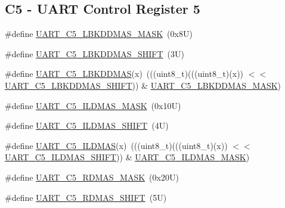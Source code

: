 \subsection*{C5 -\/ U\+A\+RT Control Register 5}
\begin{DoxyCompactItemize}
\item 
\#define \mbox{\hyperlink{group___u_a_r_t___register___masks_gad49b1674b1fa3e8be3e00d6499926d0e}{U\+A\+R\+T\+\_\+\+C5\+\_\+\+L\+B\+K\+D\+D\+M\+A\+S\+\_\+\+M\+A\+SK}}~(0x8\+U)
\item 
\#define \mbox{\hyperlink{group___u_a_r_t___register___masks_gafffde329d848e617b4983aa758f0b3fc}{U\+A\+R\+T\+\_\+\+C5\+\_\+\+L\+B\+K\+D\+D\+M\+A\+S\+\_\+\+S\+H\+I\+FT}}~(3\+U)
\item 
\#define \mbox{\hyperlink{group___u_a_r_t___register___masks_gacb884d8d6eada9e7fef6dded30e0318b}{U\+A\+R\+T\+\_\+\+C5\+\_\+\+L\+B\+K\+D\+D\+M\+AS}}(x)~(((uint8\+\_\+t)(((uint8\+\_\+t)(x)) $<$$<$ \mbox{\hyperlink{group___u_a_r_t___register___masks_gafffde329d848e617b4983aa758f0b3fc}{U\+A\+R\+T\+\_\+\+C5\+\_\+\+L\+B\+K\+D\+D\+M\+A\+S\+\_\+\+S\+H\+I\+FT}})) \& \mbox{\hyperlink{group___u_a_r_t___register___masks_gad49b1674b1fa3e8be3e00d6499926d0e}{U\+A\+R\+T\+\_\+\+C5\+\_\+\+L\+B\+K\+D\+D\+M\+A\+S\+\_\+\+M\+A\+SK}})
\item 
\#define \mbox{\hyperlink{group___u_a_r_t___register___masks_gaaccb4d1301941530866ef30d9856bcfb}{U\+A\+R\+T\+\_\+\+C5\+\_\+\+I\+L\+D\+M\+A\+S\+\_\+\+M\+A\+SK}}~(0x10\+U)
\item 
\#define \mbox{\hyperlink{group___u_a_r_t___register___masks_ga64ff52253386b38f547fbe9e9e257f3a}{U\+A\+R\+T\+\_\+\+C5\+\_\+\+I\+L\+D\+M\+A\+S\+\_\+\+S\+H\+I\+FT}}~(4\+U)
\item 
\#define \mbox{\hyperlink{group___u_a_r_t___register___masks_ga994e7eac93e9ae1e7ae7fadf84d51d47}{U\+A\+R\+T\+\_\+\+C5\+\_\+\+I\+L\+D\+M\+AS}}(x)~(((uint8\+\_\+t)(((uint8\+\_\+t)(x)) $<$$<$ \mbox{\hyperlink{group___u_a_r_t___register___masks_ga64ff52253386b38f547fbe9e9e257f3a}{U\+A\+R\+T\+\_\+\+C5\+\_\+\+I\+L\+D\+M\+A\+S\+\_\+\+S\+H\+I\+FT}})) \& \mbox{\hyperlink{group___u_a_r_t___register___masks_gaaccb4d1301941530866ef30d9856bcfb}{U\+A\+R\+T\+\_\+\+C5\+\_\+\+I\+L\+D\+M\+A\+S\+\_\+\+M\+A\+SK}})
\item 
\#define \mbox{\hyperlink{group___u_a_r_t___register___masks_gaef3503f3521ec37397d2d19e7da7bd58}{U\+A\+R\+T\+\_\+\+C5\+\_\+\+R\+D\+M\+A\+S\+\_\+\+M\+A\+SK}}~(0x20\+U)
\item 
\#define \mbox{\hyperlink{group___u_a_r_t___register___masks_gab95d268a11167ac6ab4cf41332bf5aa6}{U\+A\+R\+T\+\_\+\+C5\+\_\+\+R\+D\+M\+A\+S\+\_\+\+S\+H\+I\+FT}}~(5\+U)

\end{DoxyCompactItemize}
